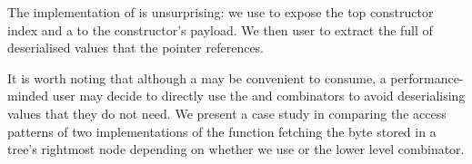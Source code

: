 
The implementation of  is unsurprising: we use
 to expose the top constructor index and a
 to the constructor's payload.
%
We then user  to extract the full
 of deserialised values that the
pointer references.


It is worth noting that although a  may be
convenient to consume, a performance-minded user may decide to
directly use the  and 
combinators to avoid deserialising values that they do not need.
%
We present a case study in  comparing the
access patterns of two implementations of the function fetching the
byte stored in a tree's rightmost node depending on whether we use
 or the lower level  combinator.
